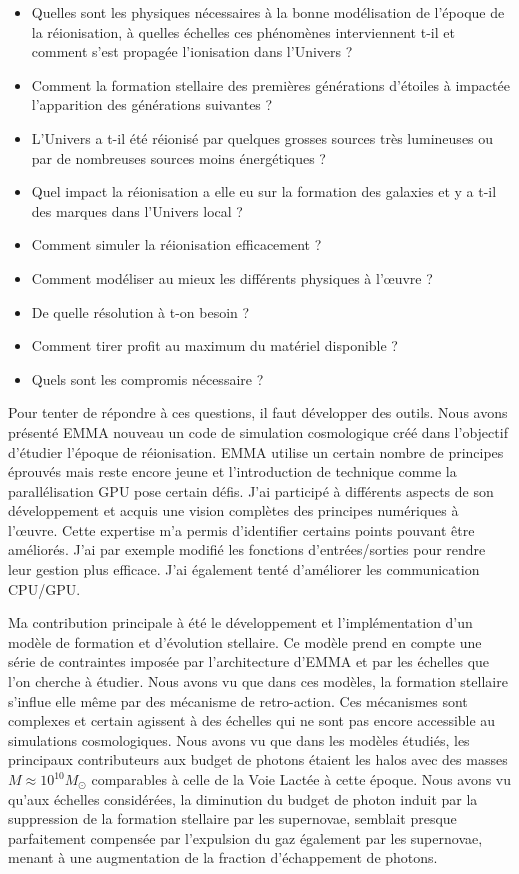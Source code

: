 \begin{itemize}
\item Quelles sont les physiques nécessaires à la bonne modélisation de l'époque de la réionisation, à quelles échelles ces phénomènes interviennent t-il et comment s'est propagée l'ionisation dans l'Univers ?
\item Comment la formation stellaire des premières générations d'étoiles à impactée l'apparition des générations suivantes ? %
\item L'Univers a t-il été réionisé par quelques grosses sources très lumineuses ou par de nombreuses sources moins énergétiques ?
\item Quel impact la réionisation a elle eu sur la formation des galaxies et y a t-il des marques dans l'Univers local ?
\item Comment simuler la réionisation efficacement ?
\item Comment modéliser au mieux les différents physiques à l’œuvre ?
\item De quelle résolution à t-on besoin ?
\item Comment tirer profit au maximum du matériel disponible ?
\item Quels sont les compromis nécessaire ?

\end{itemize}


Pour tenter de répondre à ces questions, il faut développer des outils.
Nous avons présenté EMMA nouveau un code de simulation cosmologique créé dans l'objectif d'étudier l'époque de réionisation.
EMMA utilise un certain nombre de principes éprouvés mais reste encore jeune et l'introduction de technique comme la parallélisation GPU pose certain défis.
J'ai participé à différents aspects de son développement et acquis une vision complètes des principes numériques à l’œuvre.
Cette expertise m'a permis d'identifier certains points pouvant être améliorés.
J'ai par exemple modifié les fonctions d'entrées/sorties pour rendre leur gestion plus efficace.
J'ai également tenté d'améliorer les communication CPU/GPU.

Ma contribution principale à été le développement et l'implémentation d'un modèle de formation et d'évolution stellaire.
Ce modèle prend en compte une série de contraintes imposée par l’architecture d'EMMA et par les échelles que l'on cherche à étudier.
Nous avons vu que dans ces modèles, la formation stellaire s'influe elle même par des mécanisme de retro-action.
Ces mécanismes sont complexes et certain agissent à des échelles qui ne sont pas encore accessible au simulations cosmologiques.
Nous avons vu que dans les modèles étudiés, les principaux contributeurs aux budget de photons étaient les halos avec des masses $M \approx 10^{10}M_\odot$ comparables à celle de la Voie Lactée à cette époque.
Nous avons vu qu'aux échelles considérées, la diminution du budget de photon induit par la suppression de la formation stellaire par les supernovae, semblait presque parfaitement compensée par l'expulsion du gaz également par les supernovae, menant à une augmentation de la fraction d'échappement de photons.

